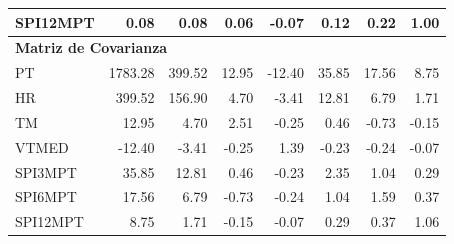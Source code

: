 \begin{table}[ht]
\begin{tabular}{lrrrrrrr}
SPI12MPT & 0.08 & 0.08 & 0.06 & -0.07 & 0.12 & 0.22 & 1.00 \\
\midrule
\multicolumn{8}{l}{\textbf{Matriz de Covarianza}} \\
\midrule
PT       & 1783.28 & 399.52 & 12.95 & -12.40 & 35.85 & 17.56 & 8.75 \\
HR       & 399.52 & 156.90 & 4.70 & -3.41 & 12.81 & 6.79 & 1.71 \\
TM       & 12.95 & 4.70 & 2.51 & -0.25 & 0.46 & -0.73 & -0.15 \\
VTMED    & -12.40 & -3.41 & -0.25 & 1.39 & -0.23 & -0.24 & -0.07 \\
SPI3MPT  & 35.85 & 12.81 & 0.46 & -0.23 & 2.35 & 1.04 & 0.29 \\
SPI6MPT  & 17.56 & 6.79 & -0.73 & -0.24 & 1.04 & 1.59 & 0.37 \\
SPI12MPT & 8.75 & 1.71 & -0.15 & -0.07 & 0.29 & 0.37 & 1.06 \\
\bottomrule
\end{tabular}
\end{table}




